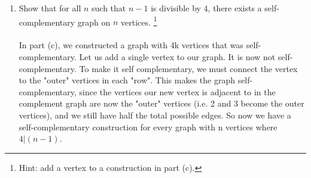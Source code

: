 \documentclass[12pt]{article}
\begin{document}
\begin{enumerate}
\begin{enumerate}
\begin{proof}
\begin{center}
\begin{tikzpicture}[main/.style = {draw, circle}]
			\end{tikzpicture}
	\end{center}
	\medskip
	Induction Step: Assume we have a simple graph, G, such that there are $4k$ vertices $\{v_1,\ldots,v_{4k}\}$, with the rules stated in the beginning, where $k\geq2$.
	(This is the pattern shown in base case $k=2$)\\
	Let us add 4 vertices to the graph and apply the rule to those vertices. We know from the base case $k=2$ that the subgraph of this new "layer" and any other layer will be self-complementary. Since the vertices in the new layer are self complementary with every other layer, and the other layers were already self-complementary in total, this new graph with $4(k+1)$ vertices is also self complementary.
\end{proof}
\item Show that for all $n$ such that $n-1$ is divisible by $4$, there exists a self-complementary graph on $n$ vertices. \footnote{Hint: add a vertex to a construction in part (c).}\\\\
In part (c), we constructed a graph with 4k vertices that was self-complementary. Let us add a single vertex to our graph. It is now not self-complementary. To make it self complementary, we must connect the vertex to the "outer" vertices in each "row". This makes the graph self-complementary, since the vertices our new vertex is adjacent to in the complement graph are now the "outer" vertices (i.e. 2 and 3 become the outer vertices), and we still have half the total possible edges. So now we have a self-complementary construction for every graph with n vertices where $4|(n-1)$. 
\end{enumerate}

\end{enumerate}
\end{document}
